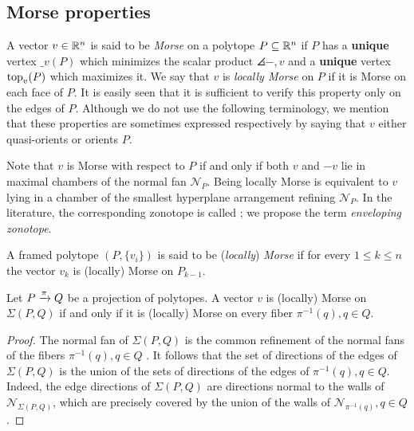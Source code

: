 
\subsection{Morse properties}


A vector $v \in \mathbb{R}^n$ is said to be \textit{Morse} on a polytope $P \subseteq \mathbb{R}^n$ if $P$ has a \textbf{unique} vertex $\bm_v(P)$ which minimizes the scalar product $\angles{-,v}$ and a \textbf{unique} vertex $\operatorname{top}_v(P)$ which maximizes it.
We say that $v$ is \textit{locally Morse} on $P$ if it is Morse on each face of $P$.
It is easily seen that it is sufficient to verify this property only on the edges of $P$.
Although we do not use the following terminology, we mention that these properties are sometimes expressed respectively by saying that $v$ either quasi-orients or orients $P$.

\begin{remark}
	Note that $v$ is Morse with respect to $P$ if and only if both $v$ and $-v$ lie in maximal chambers of the normal fan $\mathcal{N}_P$.
	Being locally Morse is equivalent to $v$ lying in a chamber of the smallest hyperplane arrangement refining $\mathcal{N}_P$. 
	In the literature, the corresponding zonotope is called ; we propose the term \emph{enveloping zonotope}.
\end{remark}

A framed polytope $(P, \{v_i\})$ is said to be (\textit{locally}) \textit{Morse} if for every $1 \leq k \leq n$ the vector $v_k$ is (locally) Morse on $P_{k-1}$.

\begin{lemma}
\label{l:orients-the-fibers}
	Let $P \xrightarrow{\pi} Q$ be a projection of polytopes.
	A vector $v$ is (locally) Morse on $\Sigma(P, Q)$ if and only if it is (locally) Morse on every fiber $\pi^{-1}(q), q \in Q$.
\end{lemma}

\begin{proof}
	The normal fan of $\Sigma(P,Q)$ is the common refinement of the normal fans of the fibers $\pi^{-1}(q), q \in Q$ \cite[Proposition 2.2]{BilleraSturmfels94}.
	It follows that the set of directions of the edges of $\Sigma(P,Q)$ is the union of the sets of directions of the edges of $\pi^{-1}(q), q \in Q$.
	Indeed, the edge directions of $\Sigma(P,Q)$ are directions normal to the walls of $\mathcal{N}_{\Sigma(P,Q)}$, which are precisely covered by the union of the walls of $\mathcal{N}_{\pi^{-1}(q)}, q \in Q$.
\end{proof}

